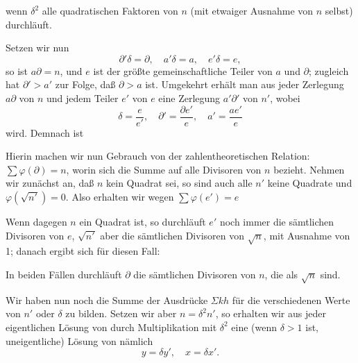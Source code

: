 wenn $\delta^2$ alle quadratischen Faktoren von $n$ (mit etwaiger
Ausnahme von $n$ selbst) durchläuft.

Setzen wir nun
\[
\partial'\delta = \partial, \quad a'\delta = a, \quad e'\delta = e,
\]
so ist $a\partial = n$, und $e$ ist der größte gemeinschaftliche Teiler
von $a$ und $\partial$; zugleich hat $\partial' > a'$ zur Folge, daß
$\partial > a$ ist. Umgekehrt erhält man aus jeder Zerlegung $a\partial$
von $n$ und jedem Teiler $e'$ von $e$ eine Zerlegung $a'\partial'$ von
$n'$, wobei
\[
\delta = \frac{e}{e'}, \quad \partial' = \frac{\partial e'}{e}, \quad a' = \frac{a e'}{e}
\]
wird. Demnach ist

Hierin machen wir nun Gebrauch von der zahlentheoretischen Relation:
$\sum \varphi(\partial) = n$, worin sich die Summe auf alle Divisoren von
$n$ bezieht. Nehmen wir zunächst an, daß $n$ kein Quadrat sei, so sind
auch alle $n'$ keine Quadrate und $\varphi(\sqrt{n'})=0$. Also erhalten
wir wegen $\sum \varphi(e') = e$

Wenn dagegen $n$ ein Quadrat ist, so durchläuft $e'$ noch immer die
sämtlichen Divisoren von $e$, $\sqrt{n'}$ aber die sämtlichen Divisoren
von $\sqrt{n}$, mit Ausnahme von 1; danach ergibt sich für diesen Fall:

In beiden Fällen durchläuft $\partial$ die sämtlichen Divisoren von $n$,
die  als $\sqrt{n}$ sind.

Wir haben nun noch die Summe der Ausdrücke $\Sigma k h$ für die
verschiedenen Werte von $n'$ oder $\delta$ zu bilden. Setzen wir aber
$n = \delta^2 n'$, so erhalten wir aus jeder eigentlichen Lösung von
durch Multiplikation mit $\delta^2$ eine (wenn $\delta > 1$ ist,
uneigentliche) Lösung von
nämlich
\[
y = \delta y', \quad x = \delta x'.
\]
